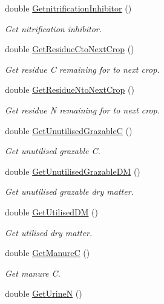 \begin{DoxyCompactItemize}
double \mbox{\hyperlink{class_crop_class_a1794eb154398af192565e22a13a6843c}{Getnitrification\+Inhibitor}} ()
\begin{DoxyCompactList}\small\item\em Get nitrification inhibitor. \end{DoxyCompactList}\item 
double \mbox{\hyperlink{class_crop_class_aaaeda0fc097e4a1d036763d1c8b7f18e}{Get\+Residue\+Cto\+Next\+Crop}} ()
\begin{DoxyCompactList}\small\item\em Get residue C remaining for to next crop. \end{DoxyCompactList}\item 
double \mbox{\hyperlink{class_crop_class_a9f0d9ed0df4b1989041592b3d2d66f40}{Get\+Residue\+Nto\+Next\+Crop}} ()
\begin{DoxyCompactList}\small\item\em Get residue N remaining for to next crop. \end{DoxyCompactList}\item 
double \mbox{\hyperlink{class_crop_class_a8a5911a8000ecbdb845a82a713f8e180}{Get\+Unutilised\+GrazableC}} ()
\begin{DoxyCompactList}\small\item\em Get unutilised grazable C. \end{DoxyCompactList}\item 
double \mbox{\hyperlink{class_crop_class_aae0797ff82a979470799b565c299ba77}{Get\+Unutilised\+Grazable\+DM}} ()
\begin{DoxyCompactList}\small\item\em Get unutilised grazable dry matter. \end{DoxyCompactList}\item 
double \mbox{\hyperlink{class_crop_class_a4c6cf05c8de9e2db60ec32498816d444}{Get\+Utilised\+DM}} ()
\begin{DoxyCompactList}\small\item\em Get utilised dry matter. \end{DoxyCompactList}\item 
double \mbox{\hyperlink{class_crop_class_ae22552454a07b7068bf27518ce7a4020}{Get\+ManureC}} ()
\begin{DoxyCompactList}\small\item\em Get manure C. \end{DoxyCompactList}\item 
double \mbox{\hyperlink{class_crop_class_a4f136a37849e61183db1d5df4e3bb606}{Get\+UrineN}} ()

\end{DoxyCompactItemize}
